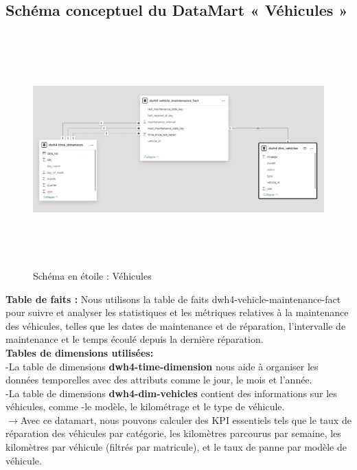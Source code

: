 \subsection{ Schéma conceptuel du DataMart « Véhicules »}
\begin{figure}[h!]

    \centering
    \includegraphics[width=1\textwidth, height=9cm]{chap6.images/mart vehicules.png}
    \caption{ Schéma en étoile : Véhicules}

\end{figure}

\noindent
\textbf{Table de faits :} Nous utilisons la table de faits dwh4-vehicle-maintenance-fact pour suivre et analyser les statistiques et les métriques relatives à la maintenance des véhicules, telles que les dates de maintenance et de réparation, l'intervalle de maintenance et le temps écoulé depuis la dernière réparation.\\

\noindent
\textbf{Tables de dimensions utilisées:}\\
-La table de dimensions \textbf{dwh4-time-dimension} nous aide à organiser les données temporelles avec des attributs comme le jour, le mois et l'année.\\
-La table de dimensions \textbf{dwh4-dim-vehicles} contient des informations sur les véhicules, comme -le modèle, le kilométrage et le type de véhicule.\\


$\rightarrow$Avec ce datamart, nous pouvons calculer des KPI essentiels tels que le taux de réparation des véhicules par catégorie, les kilomètres parcourus par semaine, les kilomètres par véhicule (filtrés par matricule), et le taux de panne par modèle de véhicule.




